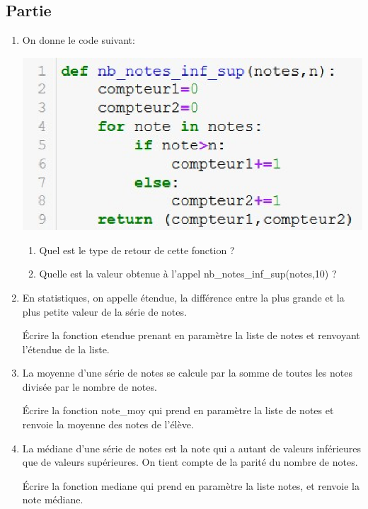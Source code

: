 \documentclass[12pt,a4paper]{article}
\newcounter{numexo}
\begin{document}
\subsection*{\Large Partie \thenumexo }
\begin{enumerate}
\item On donne le code suivant:
\begin{center}
\includegraphics[scale=0.8]{img/algo1.eps}
\end{center}
\begin{enumerate}
\item Quel est le type de retour de cette fonction ? \vspace{1cm}

\item Quelle est la valeur obtenue à l'appel \textsf{nb\_notes\_inf\_sup(notes,10)} ?\vspace{1cm}
\end{enumerate}

\item En statistiques, on appelle \textsf{étendue}, la différence entre la plus grande et la plus petite valeur de la série de notes. 

Écrire la fonction \textsf{etendue} prenant en paramètre la liste de notes et renvoyant l'étendue de la liste. \vspace{4cm}

\item La moyenne d'une série de notes se calcule par la somme de toutes les notes divisée par le nombre de notes. 

Écrire la fonction \textsf{note\_moy} qui prend en paramètre la liste de notes et renvoie la moyenne des notes de l'élève. \vspace{4cm}

\item La médiane d'une série de notes est la note qui a autant de valeurs inférieures que de valeurs supérieures. On tient compte de la parité du nombre de notes.

Écrire la fonction \textsf{mediane} qui prend en paramètre la liste notes, et renvoie la note médiane.
\end{enumerate}
\end{document}
